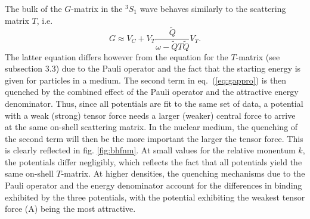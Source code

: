 The bulk of the $G$-matrix in the $^3S_1$ wave 
behaves similarly to the scattering matrix $T$, i.e.\,
\begin{equation}
    G\approx V_C + V_T \frac{\tilde{Q}}
    {\omega - \tilde{Q}T\tilde{Q}}V_T.\label{eq:gappro}
\end{equation}
The latter equation differs however from the equation for the
$T$-matrix (see subsection 3.3) due to the
Pauli operator and the fact that the starting energy is given for particles
in a medium. The second term in eq.\ (\ref{eq:gappro}) is then quenched
by the combined effect of the Pauli operator and the attractive energy
denominator. Thus, since all potentials are fit to the same set of data,
a potential with a weak (strong) tensor force needs a larger (weaker)
central force to arrive at the same on-shell scattering matrix. In the
nuclear medium, the quenching of the second term will then be the more
important the larger the tensor force. This is clearly reflected in fig.
\ref{fig:bhfnm}. At small values for the relative monentum $k$, the
potentials differ negligibly, which reflects the fact that all potentials
yield the same on-shell  $T$-matrix. At higher densities, the
quenching mechanisms due to the Pauli operator and the energy denominator
account for the differences in binding exhibited by the three potentials,
with the potential exhibiting the weakest tensor force (A) being the most
attractive.

